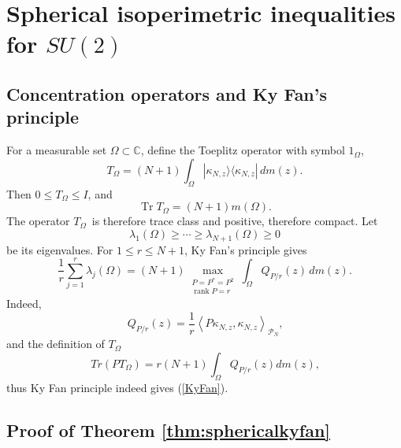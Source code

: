 \documentclass[12pt]{amsart}
\theoremstyle{plain}
\theoremstyle{definition}
\theoremstyle{remark}
\numberwithin{equation}{section}
\newcommand{\func}[1]{\operatorname{#1}}
\newcommand{\1}{\mathbf 1}
\begin{document}
\section{Spherical isoperimetric inequalities for $SU(2)$}

\subsection{Concentration operators and Ky Fan's principle}

For a measurable set $\Omega \subset \mathbb{C}$, define the Toeplitz
operator with symbol $1_{\Omega }$, 
\begin{equation}
T_{\Omega }=(N+1)\int_{\Omega }|\kappa _{N,z}\rangle \langle \kappa
_{N,z}|\,dm(z).  \label{eq:concentrationoperator}
\end{equation}%
Then $0\leq T_{\Omega }\leq I$, and 
\begin{equation}
\func{Tr}T_{\Omega }=(N+1)m(\Omega ).  \label{eq:traceconcentration}
\end{equation}%
The operator $T_{\Omega }$\ is therefore trace class and positive, therefore
compact. Let 
\begin{equation*}
\lambda _{1}(\Omega )\geq \cdots \geq \lambda _{N+1}(\Omega )\geq 0
\end{equation*}%
be its eigenvalues. For $1\leq r\leq N+1$, Ky Fan's principle gives 
\begin{equation}
\frac{1}{r}\sum_{j=1}^{r}\lambda _{j}(\Omega )=(N+1)\max_{\substack{ %
P=P^{\ast }=P^{2} \\ \func{rank}P=r}}\int_{\Omega }Q_{P/r}(z)\,dm(z).
\label{KyFan}
\end{equation}%
Indeed, 
\begin{equation*}
Q_{P/r}(z)=\frac{1}{r}\left\langle P\kappa _{N,z},\kappa _{N,z}\right\rangle
_{\mathcal{P}_{N}}\text{,}
\end{equation*}%
and the definition of $T_{\Omega }$ 
\begin{equation*}
Tr\left( PT_{\Omega }\right) =r(N+1)\int_{\Omega }Q_{P/r}(z)dm(z)\text{,}
\end{equation*}%
thus Ky Fan principle indeed gives (\ref{KyFan}).

\subsection{Proof of Theorem \protect\ref{thm:sphericalkyfan}}
\end{document}
